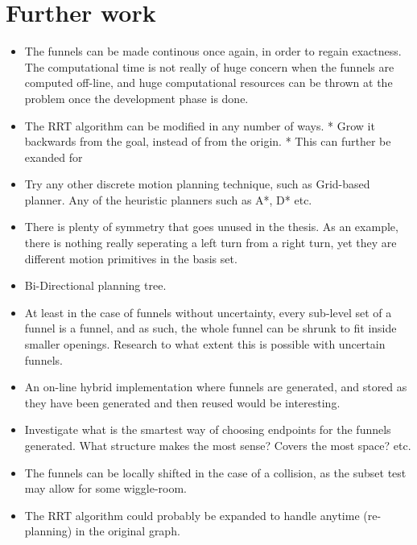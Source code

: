 \chapter{Further work}

\begin{itemize}
  \item The funnels can be made continous once again, in order to regain
    exactness. The computational time is not really of huge concern when the
    funnels are computed off-line, and huge computational resources can be
    thrown at the problem once the development phase is done.
  \item The RRT algorithm can be modified in any number of ways.
    * Grow it backwards from the goal, instead of from the origin.
    * This can further be exanded for 

  \item Try any other discrete motion planning technique, such as Grid-based
    planner. Any of the heuristic planners such as A*, D* etc.

  \item There is plenty of symmetry that goes unused in the thesis. As an
    example, there is nothing really seperating a left turn from a right turn,
    yet they are different motion primitives in the basis set.

  \item Bi-Directional planning tree.

  \item At least in the case of funnels without uncertainty, every sub-level set
    of a funnel is a funnel, and as such, the whole funnel can be shrunk to fit
    inside smaller openings. Research to what extent this is possible with
    uncertain funnels.

  \item An on-line hybrid implementation where funnels are generated, and stored
    as they have been generated and then reused would be interesting.

  \item  Investigate what is the smartest way of choosing endpoints for the
    funnels generated. What structure makes the most sense? Covers the most
    space? etc.

  \item The funnels can be locally shifted in the case of a collision, as the
    subset test may allow for some wiggle-room.

  \item The RRT algorithm could probably be expanded to handle anytime
    (re-planning) in the original graph.


\end{itemize}
